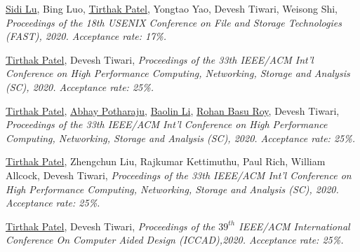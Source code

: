 {\textnormal{\newline \underline{Sidi Lu}, Bing Luo, \underline{Tirthak Patel}, Yongtao Yao, Devesh Tiwari, Weisong Shi,}} {\textit{Proceedings of the 18th USENIX Conference on File and Storage Technologies (FAST), 2020. Acceptance rate: 17\%.\newline}}{}{}{} %

{\textnormal{\newline \underline{Tirthak Patel}, Devesh Tiwari,}} {\textit{Proceedings of the 33th IEEE/ACM Int'l Conference on High Performance Computing, Networking, Storage and Analysis (SC), 2020. Acceptance rate: 25\%.\newline}}{}{}{} %

{\textnormal{\newline \underline{Tirthak Patel}, \underline{Abhay Potharaju}, \underline{Baolin Li}, \underline{Rohan Basu Roy}, Devesh Tiwari,}} {\textit{Proceedings of the 33th IEEE/ACM Int'l Conference on High Performance Computing, Networking, Storage and Analysis (SC), 2020. Acceptance rate: 25\%.\newline}}{}{}{} %

{\textnormal{\newline \underline{Tirthak Patel}, Zhengchun Liu, Rajkumar Kettimuthu, Paul Rich, William Allcock, Devesh Tiwari,}} {\textit{Proceedings of the 33th IEEE/ACM Int'l Conference on High Performance Computing, Networking, Storage and Analysis (SC), 2020. Acceptance rate: 25\%.\newline}}{}{}{} %

{\textnormal{\newline \underline{Tirthak Patel}, Devesh Tiwari,}} {\textit{Proceedings of the $39^{th}$ IEEE/ACM International Conference On Computer Aided Design (ICCAD),2020. Acceptance rate: 25\%.\newline}}{}{}{} %

